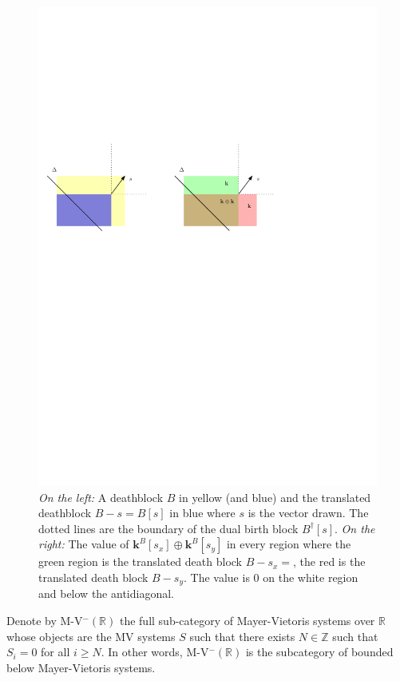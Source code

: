 \documentclass[a4paper, english, 11pt]{article}
\newcommand{\kk}[0]{\textbf{k}}
\newcommand{\0}{\vec{0}}
\newcommand{\R}[0]{\mathbb{R}}
\newcommand{\Z}[0]{\mathbb{Z}}
\begin{document}
\begin{figure}
 \begin{center}
  \includegraphics{TranslateofBlocks.pdf}
  \caption{\emph{On the left:} A deathblock $B$ in yellow (and blue) and the translated deathblock $B-s=B[s]$ in blue where $s$ is the vector drawn. The dotted lines are the boundary of the dual birth block $B^{\dagger}[s]$. 
    \emph{On the right:} The  value of $\kk^B[s_x]\oplus \kk^B[s_y]$ in every region where the green region is the  translated death block $B-s_x=$, the red is the translated death block $B-s_y$. The value is $0$ on the white region and below the antidiagonal.  }
  \label{fig:translationblocks}
 \end{center}
\end{figure}


Denote by M-V$^- (\R)$ the full sub-category of Mayer-Vietoris systems over $\R$ whose objects are the MV systems $S$ such that there exists $N\in\Z$ such that $S_i = 0$ for all $i\geq N$. In other words, M-V$^- (\R)$ is the subcategory of bounded below Mayer-Vietoris systems.
\end{document}
